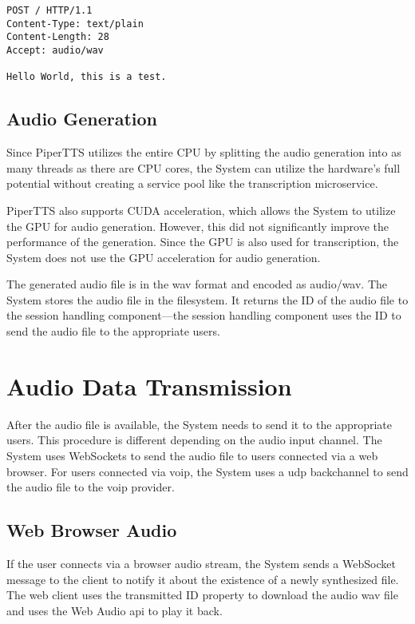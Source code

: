 \begin{verbatim}
POST / HTTP/1.1
Content-Type: text/plain
Content-Length: 28
Accept: audio/wav

Hello World, this is a test.

\end{verbatim}

\subsection{Audio Generation}

Since PiperTTS utilizes the entire CPU by splitting the audio generation into as many threads as there are CPU cores, 
the System can utilize the hardware's full potential without creating a service pool like the transcription 
microservice.

PiperTTS also supports CUDA acceleration, which allows the System to utilize the GPU for audio generation. However, 
this did not significantly improve the performance of the generation. Since the GPU is also used for transcription, 
the System does not use the GPU acceleration for audio generation.

The generated audio file is in the \ac{wav} format and encoded as audio/wav. The System stores the audio file in the 
filesystem. It returns the ID of the audio file to the session handling component—the session handling component uses 
the ID to send the audio file to the appropriate users. 


\section{Audio Data Transmission}

After the audio file is available, the System needs to send it to the appropriate users. This procedure is different 
depending on the audio input channel. The System uses WebSockets to send the audio file to users connected via a web 
browser. For users connected via \ac{voip}, the System uses a \ac{udp} backchannel to send the audio file to the 
\ac{voip} provider.

\subsection{Web Browser Audio}

If the user connects via a browser audio stream, the System sends a WebSocket message to the client to notify it about 
the existence of a newly synthesized file. The web client uses the transmitted ID property to download the audio 
\ac{wav} file and uses the Web Audio \ac{api} to play it back.

